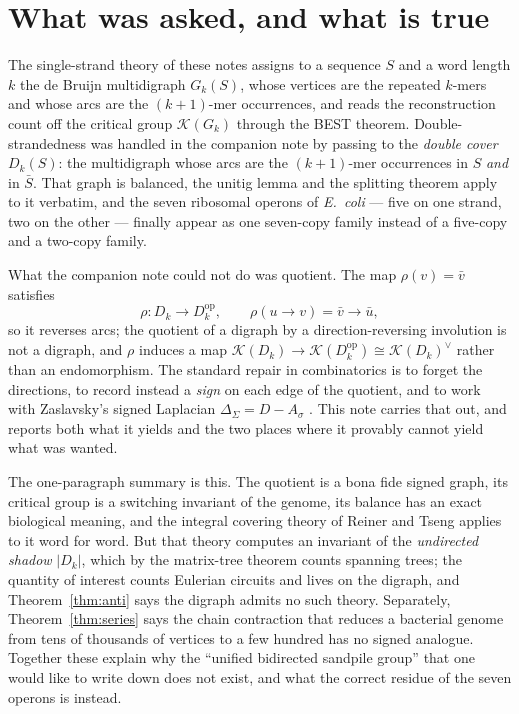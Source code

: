 \documentclass[11pt]{article}
\theoremstyle{plain}
\theoremstyle{definition}
\theoremstyle{remark}
\newcommand{\K}{\mathcal{K}}
\newcommand{\Sig}{\Sigma}
\begin{document}
\section{What was asked, and what is true}

The single-strand theory of these notes assigns to a sequence $S$ and a word length $k$ the
de Bruijn multidigraph $G_k(S)$, whose vertices are the repeated $k$-mers and whose arcs are
the $(k{+}1)$-mer occurrences, and reads the reconstruction count off the critical group
$\K(G_k)$ through the BEST theorem. Double-strandedness was handled in the companion note by
passing to the \emph{double cover} $D_k(S)$: the multidigraph whose arcs are the
$(k{+}1)$-mer occurrences in $S$ \emph{and} in $\bar S$. That graph is balanced, the unitig
lemma and the splitting theorem apply to it verbatim, and the seven ribosomal operons of
\emph{E.\ coli} --- five on one strand, two on the other --- finally appear as one
seven-copy family instead of a five-copy and a two-copy family.

What the companion note could not do was quotient. The map $\rho(v)=\bar v$ satisfies
\[
  \rho\colon D_k \longrightarrow D_k^{\mathrm{op}},\qquad
  \rho(u\to v)=\bar v\to\bar u ,
\]
so it reverses arcs; the quotient of a digraph by a direction-reversing involution is not a
digraph, and $\rho$ induces a map $\K(D_k)\to\K(D_k^{\mathrm{op}})\cong\K(D_k)^\vee$ rather
than an endomorphism. The standard repair in combinatorics is to forget the directions, to
record instead a \emph{sign} on each edge of the quotient, and to work with Zaslavsky's
signed Laplacian $\Delta_\Sig=D-A_\sigma$ \cite{Zas82}. This note carries that out, and
reports both what it yields and the two places where it provably cannot yield what was
wanted.

The one-paragraph summary is this. The quotient is a bona fide signed graph, its critical
group is a switching invariant of the genome, its balance has an exact biological meaning,
and the integral covering theory of Reiner and Tseng \cite{RT14} applies to it word for word.
But that theory computes an invariant of the \emph{undirected shadow} $|D_k|$, which by the
matrix-tree theorem counts spanning trees; the quantity of interest counts Eulerian circuits
and lives on the digraph, and Theorem~\ref{thm:anti} says the digraph admits no such theory.
Separately, Theorem~\ref{thm:series} says the chain contraction that reduces a bacterial
genome from tens of thousands of vertices to a few hundred has no signed analogue. Together
these explain why the ``unified bidirected sandpile group'' that one would like to write down
does not exist, and what the correct residue of the seven operons is instead.
\end{document}
